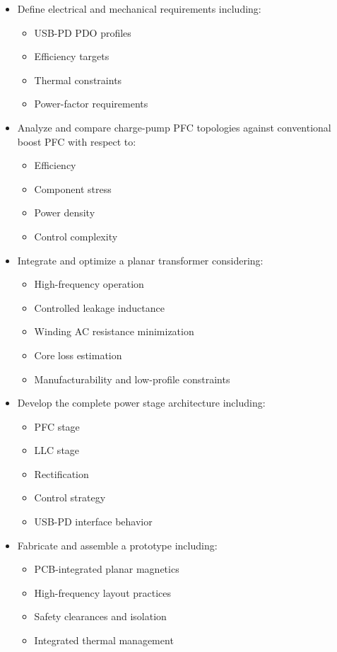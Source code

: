 \documentclass[12pt,a4paper]{report}
\begin{document}
\begin{itemize}
    \item Define electrical and mechanical requirements including:
    \begin{itemize}
        \item USB-PD PDO profiles
        \item Efficiency targets
        \item Thermal constraints
        \item Power-factor requirements
    \end{itemize}

    \item Analyze and compare charge-pump PFC topologies against conventional boost PFC with respect to:
    \begin{itemize}
        \item Efficiency
        \item Component stress
        \item Power density
        \item Control complexity
    \end{itemize}

    \item Integrate and optimize a planar transformer considering:
    \begin{itemize}
        \item High-frequency operation
        \item Controlled leakage inductance
        \item Winding AC resistance minimization
        \item Core loss estimation
        \item Manufacturability and low-profile constraints
    \end{itemize}

    \item Develop the complete power stage architecture including:
    \begin{itemize}
        \item PFC stage
        \item LLC stage
        \item Rectification
        \item Control strategy
        \item USB-PD interface behavior
    \end{itemize}

    \item Fabricate and assemble a prototype including:
    \begin{itemize}
        \item PCB-integrated planar magnetics
        \item High-frequency layout practices
        \item Safety clearances and isolation
        \item Integrated thermal management
    \end{itemize}


\end{itemize}
\end{document}
